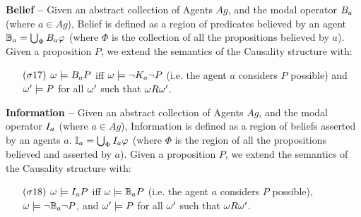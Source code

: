 \begin{definition}{\bf Belief --}\label{def:belief}
	Given an abstract collection of Agents $Ag$, and the modal operator
	$B_{a}$ (where $a\in Ag$), Belief is defined as a region 
	of predicates believed by an agent $\mathbb{B}_{a}=\bigcup_\Phi B_{a}\varphi$
	(where $\Phi$ is the collection of all the propositions believed by $a$).
	Given a proposition $P$, we extend the semantics of the Causality structure with:
	\begin{enumerate}[noitemsep]
		\item[$(\sigma17)$] $\omega\models B_{a}P$ iff
			$\omega\models\neg K_{a}\neg P$ (i.e. the agent $a$ considers $P$ possible) 
			and $\omega'\models P$ for all
			$\omega'$ such that $\omega R\omega'$.
	\end{enumerate}
\end{definition}

\begin{definition}{\bf Information --}\label{def:information}
	Given an abstract collection of Agents $Ag$, and the modal operator
	$I_{a}$ (where $a\in Ag$), Information is defined as a region 
	of beliefs asserted by an agents $a$.
	$\mathbb{I}_{a}=\bigcup_\Phi I_{a}{\varphi}$
	(where $\Phi$ is the region of all the propositions believed and asserted by $a$).
	Given a proposition $P$, we extend the semantics of the Causality structure with:
	\begin{enumerate}[noitemsep]
		\item[$(\sigma18)$] $\omega\models I_{a}P$ iff
			$\omega\models\mathbb{B}_{a}{P}$ (i.e. the agent $a$ considers $P$ possible), 
			$\omega\models\neg\mathbb{B}_{a}{\neg P}$, and $\omega'\models P$ for all
			$\omega'$ such that $\omega R\omega'$.
	\end{enumerate}
\end{definition}

